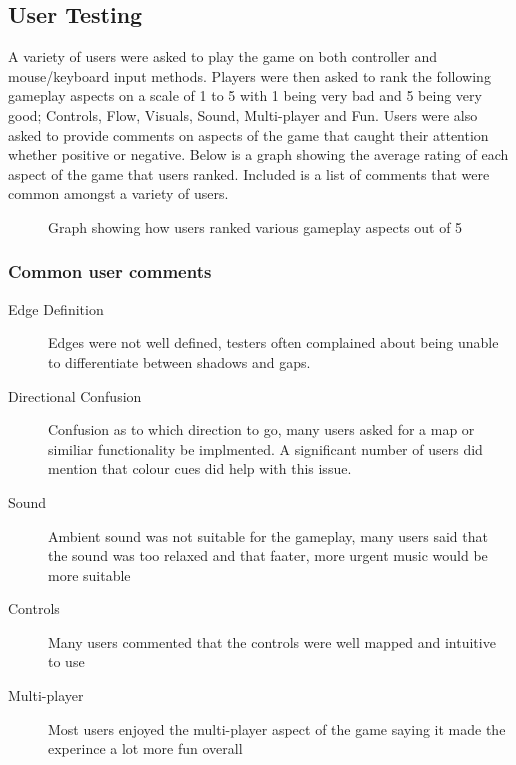 \documentclass[11pt,a4paper]{article}
\begin{document}
\subsection {User Testing}
A variety of users were asked to play the game on both controller and mouse/keyboard input methods. Players were then asked to rank the following gameplay aspects on a scale of 1 to 5 with 1 being very bad and 5 being very good; Controls, Flow, Visuals, Sound, Multi-player and Fun. Users were also asked to provide comments on aspects of the game that caught their attention whether positive or negative. Below is a graph showing the average rating of each aspect of the game that users ranked. Included is a list of comments that were common amongst a variety of users.
\begin{figure}[H]
	\caption{Graph showing how users ranked various gameplay aspects out of 5}
	\label{fig:userTestGraph}
\end{figure}
\subsubsection{Common user comments}
\begin{description}
	\item [Edge Definition] Edges were not well defined, testers often complained about being unable to differentiate between shadows and gaps.
	\item [Directional Confusion] Confusion as to which direction to go, many users asked for a map or similiar functionality be implmented. A significant number of users did mention that colour cues did help with this issue.
	\item [Sound] Ambient sound was not suitable for the gameplay, many users said that the sound was too relaxed and that faater, more urgent music would be more suitable
	\item [Controls] Many users commented that the controls were well mapped and intuitive to use
	\item [Multi-player] Most users enjoyed the multi-player aspect of the game saying it made the experince a lot more fun overall
\end{description}
\end{document}
